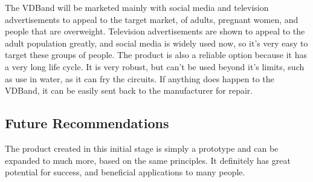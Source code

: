 \documentclass[11.5pt]{article}
\begin{document}
The VDBand will be marketed mainly with social media and television advertisements to appeal to the target market, of adults, pregnant women, and people that are overweight. Television advertisements are shown to appeal to the adult population greatly, and social media is widely used now, so it's very easy to target these groups of people. The product is also a reliable option because it has a very long life cycle. It is very robust, but can't be used beyond it's limits, such as use in water, as it can fry the circuits. If anything does happen to the VDBand, it can be easily sent back to the manufacturer for repair.\\

\subsection{Future Recommendations}
The product created in this initial stage is simply a prototype and can be expanded to much more, based on the same principles. It definitely has great potential for success, and beneficial applications to many people. 
\end{document}
